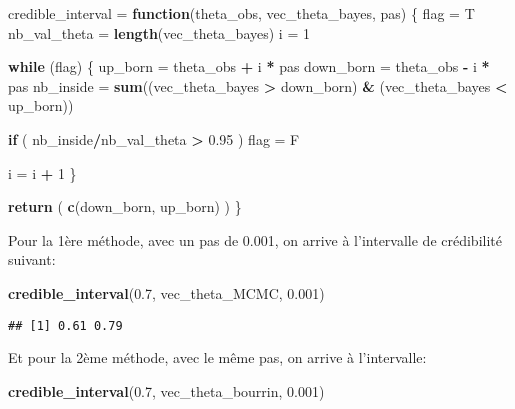 \documentclass[]{article}
\newenvironment{Shaded}{\begin{snugshade}}{\end{snugshade}}
\newcommand{\ControlFlowTok}[1]{\textcolor[rgb]{0.13,0.29,0.53}{\textbf{#1}}}
\newcommand{\DecValTok}[1]{\textcolor[rgb]{0.00,0.00,0.81}{#1}}
\newcommand{\FloatTok}[1]{\textcolor[rgb]{0.00,0.00,0.81}{#1}}
\newcommand{\KeywordTok}[1]{\textcolor[rgb]{0.13,0.29,0.53}{\textbf{#1}}}
\newcommand{\NormalTok}[1]{#1}
\newcommand{\OperatorTok}[1]{\textcolor[rgb]{0.81,0.36,0.00}{\textbf{#1}}}
\newcommand{\StringTok}[1]{\textcolor[rgb]{0.31,0.60,0.02}{#1}}
\begin{document}
\begin{Shaded}
\begin{Highlighting}[]
\NormalTok{credible_interval =}\StringTok{ }\ControlFlowTok{function}\NormalTok{(theta_obs, vec_theta_bayes, pas)}
\NormalTok{\{}
\NormalTok{  flag =}\StringTok{ }\NormalTok{T}
\NormalTok{  nb_val_theta =}\StringTok{ }\KeywordTok{length}\NormalTok{(vec_theta_bayes)}
\NormalTok{  i =}\StringTok{ }\DecValTok{1}
  
  \ControlFlowTok{while}\NormalTok{ (flag)}
\NormalTok{  \{}
\NormalTok{    up_born =}\StringTok{ }\NormalTok{theta_obs }\OperatorTok{+}\StringTok{ }\NormalTok{i }\OperatorTok{*}\StringTok{ }\NormalTok{pas}
\NormalTok{    down_born =}\StringTok{ }\NormalTok{theta_obs }\OperatorTok{-}\StringTok{ }\NormalTok{i }\OperatorTok{*}\StringTok{ }\NormalTok{pas}
\NormalTok{    nb_inside =}\StringTok{ }\KeywordTok{sum}\NormalTok{((vec_theta_bayes }\OperatorTok{>}\StringTok{ }\NormalTok{down_born) }\OperatorTok{&}\StringTok{ }\NormalTok{(vec_theta_bayes }\OperatorTok{<}\StringTok{ }\NormalTok{up_born))}
    
    \ControlFlowTok{if}\NormalTok{ ( nb_inside}\OperatorTok{/}\NormalTok{nb_val_theta }\OperatorTok{>}\StringTok{ }\FloatTok{0.95}\NormalTok{ )}
\NormalTok{      flag =}\StringTok{ }\NormalTok{F}
    
\NormalTok{    i =}\StringTok{ }\NormalTok{i }\OperatorTok{+}\StringTok{ }\DecValTok{1}
\NormalTok{  \}}
  
  \KeywordTok{return}\NormalTok{ ( }\KeywordTok{c}\NormalTok{(down_born, up_born) )}
\NormalTok{\}}
\end{Highlighting}
\end{Shaded}

Pour la 1ère méthode, avec un pas de 0.001, on arrive à l'intervalle de
crédibilité suivant:

\begin{Shaded}
\begin{Highlighting}[]
\KeywordTok{credible_interval}\NormalTok{(}\FloatTok{0.7}\NormalTok{, vec_theta_MCMC, }\FloatTok{0.001}\NormalTok{)}
\end{Highlighting}
\end{Shaded}

\begin{verbatim}
## [1] 0.61 0.79
\end{verbatim}

Et pour la 2ème méthode, avec le même pas, on arrive à l'intervalle:

\begin{Shaded}
\begin{Highlighting}[]
\KeywordTok{credible_interval}\NormalTok{(}\FloatTok{0.7}\NormalTok{, vec_theta_bourrin, }\FloatTok{0.001}\NormalTok{)}
\end{Highlighting}
\end{Shaded}
\end{document}
